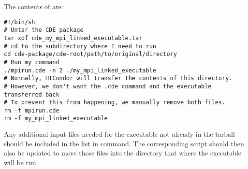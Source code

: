 The contents of  are:
\begin{verbatim}
#!/bin/sh
# Untar the CDE package
tar xpf cde_my_mpi_linked_executable.tar
# cd to the subdirectory where I need to run
cd cde-package/cde-root/path/to/original/directory
# Run my command
./mpirun.cde -n 2 ./my_mpi_linked_executable
# Normally, HTCondor will transfer the contents of this directory.
# However, we don't want the .cde command and the executable transferred back
# To prevent this from happening, we manually remove both files.
rm -f mpirun.cde
rm -f my_mpi_linked_executable
\end{verbatim}

Any additional input files needed for the executable not already in the tarball
should be included in the list in  command. 
The corresponding script should then also be updated to move those files into
the directory that where the executable will be run.



